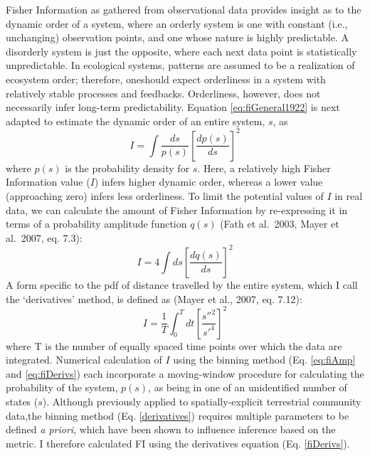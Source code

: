 \documentclass[12pt,twoside,openany]{reedthesis}
\begin{document}
Fisher Information as gathered from observational data provides insight as to the dynamic order of a system, where an orderly system is one with constant (i.e., unchanging) observation points, and one whose nature is highly predictable. A disorderly system is just the opposite, where each next data point is statistically unpredictable. In ecological systems, patterns are assumed to be a realization of ecosystem order; therefore, oneshould expect orderliness in a system with relatively stable processes and feedbacks. Orderliness, however, does not necessarily infer long-term predictability. Equation \eqref{eq:fiGeneral1922} is next adapted to estimate the dynamic order of an entire system, \(s\), as
\begin{equation} 
  I = \int \frac{ds}{p(s)}\left[\frac{dp(s)}{ds}\right]^2
  \label{eq:fi73c}
\end{equation}
where \(p(s)\) is the probability density for \(s\). Here, a relatively high Fisher Information value (\(I\)) infers higher dynamic order, whereas a lower value (approaching zero) infers less orderliness. To limit the potential values of \(I\) in real data, we can calculate the amount of Fisher Information by re-expressing it in terms of a probability amplitude function \(q(s)\) (Fath et al.~2003, Mayer et al.~2007, eq. 7.3):
\begin{equation}
  I = 4 \int ds\left[\frac{dq(s)}{ds}\right]^2
  \label{eq:fiAmp}
\end{equation}
A form specific to the pdf of distance travelled by the entire system, which I call the `derivatives' method, is defined as (Mayer et al., 2007, eq. 7.12):
\begin{equation}
  I = \frac{1}{T} \int_0^T dt\left[\frac{s''^2}{s'^4}\right]^2
  \label{eq:fiDerivs}
\end{equation}
where T is the number of equally spaced time points over which the data are integrated. Numerical calculation of \(I\) using the binning method (Eq. \eqref{eq:fiAmp} and \eqref{eq:fiDerivs}) each incorporate a moving-window procedure for calculating the probability of the system, \(p(s)\), as being in one of an unidentified number of states (\(s\)). Although previously applied to spatially-explicit terrestrial community data,the binning method (Eq. \ref{derivatives}) requires multiple parameters to be defined \emph{a priori}, which have been shown to influence inference based on the metric. I therefore calculated FI using the derivatives equation (Eq. \ref{fiDerivs}).
\end{document}
